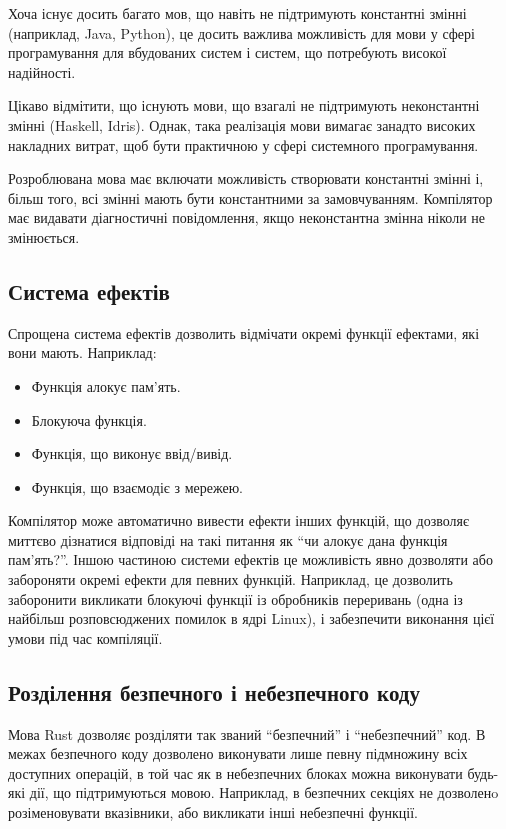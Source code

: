 \documentclass[main.tex]{subfiles}
\begin{document}
Хоча існує досить багато мов, що навіть не підтримують константні змінні (наприклад, Java, Python), це досить важлива можливість для мови у сфері програмування для вбудованих систем і систем, що потребують високої надійності.

Цікаво відмітити, що існують мови, що взагалі не підтримують неконстантні змінні (Haskell, Idris). Однак, така реалізація мови вимагає занадто високих накладних витрат, щоб бути практичною у сфері системного програмування.

Розроблювана мова має включати можливість створювати константні змінні і, більш того, всі змінні мають бути константними за замовчуванням. Компілятор має видавати діагностичні повідомлення, якщо неконстантна змінна ніколи не змінюється.

\subsection{Система ефектів}
Спрощена система ефектів дозволить відмічати окремі функції ефектами, які вони мають. Наприклад:
\begin{itemize}[nosep]
\item Функція алокує пам'ять.
\item Блокуюча функція.
\item Функція, що виконує ввід/вивід.
\item Функція, що взаємодіє з мережею.
\end{itemize}

Компілятор може автоматично вивести ефекти інших функцій, що дозволяє миттєво дізнатися відповіді на такі питання як ``чи алокує дана функція пам'ять?''. Іншою частиною системи ефектів це можливість явно дозволяти або забороняти окремі ефекти для певних функцій. Наприклад, це дозволить заборонити викликати блокуючі функції із обробників переривань (одна із найбільш розповсюджених помилок в ядрі Linux), і забезпечити виконання цієї умови під час компіляції.

\subsection{Розділення безпечного і небезпечного коду}
Мова Rust дозволяє розділяти так званий ``безпечний'' і ``небезпечний'' код.
В межах безпечного коду дозволено виконувати лише певну підмножину всіх доступних операцій, в той час як в небезпечних блоках можна виконувати будь-які дії, що підтримуються мовою.
Наприклад, в безпечних секціях не дозволенo розіменовувати вказівники, або викликати інші небезпечні функції.
\end{document}
